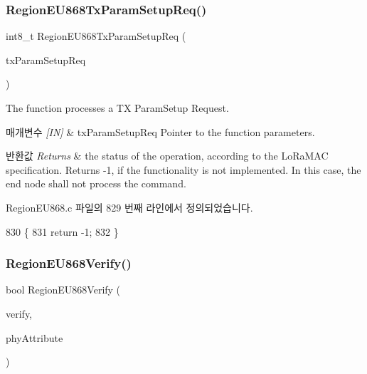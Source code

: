 \subsubsection{\texorpdfstring{Region\+E\+U868\+Tx\+Param\+Setup\+Req()}{RegionEU868TxParamSetupReq()}}
{\footnotesize\ttfamily int8\+\_\+t Region\+E\+U868\+Tx\+Param\+Setup\+Req (\begin{DoxyParamCaption}\item[{\mbox{\hyperlink{group___r_e_g_i_o_n_ga26836ef2996e70410e42ef471073f855}{Tx\+Param\+Setup\+Req\+Params\+\_\+t}} $\ast$}]{tx\+Param\+Setup\+Req }\end{DoxyParamCaption})}



The function processes a TX Param\+Setup Request. 


\begin{DoxyParams}{매개변수}
{\em \mbox{[}\+I\+N\mbox{]}} & tx\+Param\+Setup\+Req Pointer to the function parameters.\\
\hline
\end{DoxyParams}

\begin{DoxyRetVals}{반환값}
{\em Returns} & the status of the operation, according to the Lo\+Ra\+M\+AC specification. Returns -\/1, if the functionality is not implemented. In this case, the end node shall not process the command. \\
\hline
\end{DoxyRetVals}


Region\+E\+U868.\+c 파일의 829 번째 라인에서 정의되었습니다.


\begin{DoxyCode}
830 \{
831     \textcolor{keywordflow}{return} -1;
832 \}
\end{DoxyCode}
\mbox{\label{group___r_e_g_i_o_n_e_u868_ga66189a5f3ba138e24f8033d55e9b72a7}} 
\subsubsection{\texorpdfstring{Region\+E\+U868\+Verify()}{RegionEU868Verify()}}
{\footnotesize\ttfamily bool Region\+E\+U868\+Verify (\begin{DoxyParamCaption}\item[{\mbox{\hyperlink{group___r_e_g_i_o_n_ga966d97bc2f25df1c09e92e60ef652276}{Verify\+Params\+\_\+t}} $\ast$}]{verify,  }\item[{\mbox{\hyperlink{group___r_e_g_i_o_n_ga9445b07fdf77581ecfaf389970e635f8}{Phy\+Attribute\+\_\+t}}}]{phy\+Attribute }\end{DoxyParamCaption})}



